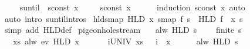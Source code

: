 \begin{isabellebody}
%
\isadelimproof
%
\endisadelimproof
%
\isatagproof
{}\isamarkupfalse%
\isanewline
\ \ \isamarkupfalse%
\ {\isachardoublequoteopen}{\isacharparenleft}{\isasymphi}\ suntil\ {\isasympsi}{\isacharparenright}\ {\isacharparenleft}sconst\ x{\isacharparenright}{\isachardoublequoteclose}\ \isamarkupfalse%
\ \isamarkupfalse%
\ {\isachardoublequoteopen}{\isasympsi}\ {\isacharparenleft}sconst\ x{\isacharparenright}{\isachardoublequoteclose}\isanewline
\ \ \ \ \isamarkupfalse%
\ {\isacharparenleft}induction\ {\isachardoublequoteopen}sconst\ x{\isachardoublequoteclose}{\isacharparenright}\ auto\isanewline
{}\isamarkupfalse%
\ {\isacharparenleft}auto\ intro{\isacharcolon}\ suntil{\isachardot}intros{\isacharparenright}%
\endisatagproof
{\isafoldproof}%
%
\isadelimproof
\isanewline
%
\endisadelimproof
\isanewline
{}\isamarkupfalse%
\ hld{\isacharunderscore}smap{\isacharprime}{\isacharcolon}\ {\isachardoublequoteopen}HLD\ x\ {\isacharparenleft}smap\ f\ s{\isacharparenright}\ {\isacharequal}\ HLD\ {\isacharparenleft}f\ {\isacharminus}{\isacharbackquote}\ x{\isacharparenright}\ s{\isachardoublequoteclose}\isanewline
%
\isadelimproof
\ \ %
\endisadelimproof
%
\isatagproof
{}\isamarkupfalse%
\ {\isacharparenleft}simp\ add{\isacharcolon}\ HLD{\isacharunderscore}def{\isacharparenright}%
\endisatagproof
{\isafoldproof}%
%
\isadelimproof
\isanewline
%
\endisadelimproof
\isanewline
{}\isamarkupfalse%
\ pigeonhole{\isacharunderscore}stream{\isacharcolon}\isanewline
\ \ \ {\isachardoublequoteopen}alw\ {\isacharparenleft}HLD\ s{\isacharparenright}\ {\isasymomega}{\isachardoublequoteclose}\isanewline
\ \ \ {\isachardoublequoteopen}finite\ s{\isachardoublequoteclose}\isanewline
\ \ \ {\isachardoublequoteopen}{\isasymexists}x{\isasymin}s{\isachardot}\ alw\ {\isacharparenleft}ev\ {\isacharparenleft}HLD\ {\isacharbraceleft}x{\isacharbraceright}{\isacharparenright}{\isacharparenright}\ {\isasymomega}{\isachardoublequoteclose}\isanewline
%
\isadelimproof
%
\endisadelimproof
%
\isatagproof
{}\isamarkupfalse%
\ {\isacharminus}\isanewline
\ \ \isamarkupfalse%
\ {\isachardoublequoteopen}{\isasymforall}i{\isasymin}UNIV{\isachardot}\ {\isasymexists}x{\isasymin}s{\isachardot}\ {\isasymomega}\ {\isacharbang}{\isacharbang}\ i\ {\isacharequal}\ x{\isachardoublequoteclose}\isanewline
\ \ \ \ \isamarkupfalse%
\ {\isacartoucheopen}alw\ {\isacharparenleft}HLD\ s{\isacharparenright}\ {\isasymomega}{\isacartoucheclose}\ \isamarkupfalse%

\end{isabellebody}
